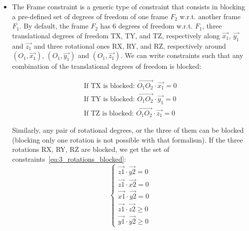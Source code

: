 \begin{itemize}

\item The Frame constraint is a generic type of constraint that consists in blocking a pre-defined set of degrees of freedom of one frame $F_2$ w.r.t. another frame $F_1$.
By default, the frame $F_2$ has 6 degrees of freedom w.r.t. $F_1$, three translational degrees of freedom TX, TY, and TZ, respectively along $\vec{x_1}$, $\vec{y_1}$ and $\vec{z_1}$ and three rotational ones RX, RY, and RZ, respectively around $(O_1,\vec{x_1})$, $(O_1,\vec{y_1})$ and $(O_1,\vec{z_1})$.
We can write constraints such that any combination of the translational degrees of freedom is blocked:

\begin{align}
  \text{If TX is blocked: } \overrightarrow{O_1 O_2} \cdot \vec{x_1} = 0 \\
  \text{If TY is blocked: } \overrightarrow{O_1 O_2} \cdot \vec{y_1} = 0 \\
  \text{If TZ is blocked: } \overrightarrow{O_1 O_2} \cdot \vec{z_1} = 0
\end{align}

Similarly, any pair of rotational degrees, or the three of them can be blocked (blocking only one rotation is not possible with that formalism).
If the three rotations RX, RY, RZ are blocked, we get the set of constraints~\ref{eq:3_rotations_blocked}:
\begin{equation}
\label{eq:3_rotations_blocked}
\begin{cases}
  \vec{z1}\cdot\vec{y2} = 0 \\
  \vec{z1}\cdot\vec{x2} = 0 \\
  \vec{x1}\cdot\vec{y2} = 0 \\
  \vec{z1}\cdot\vec{z2} \geq 0 \\
  \vec{y1}\cdot\vec{y2} \geq 0
\end{cases}
\end{equation}


\end{itemize}
